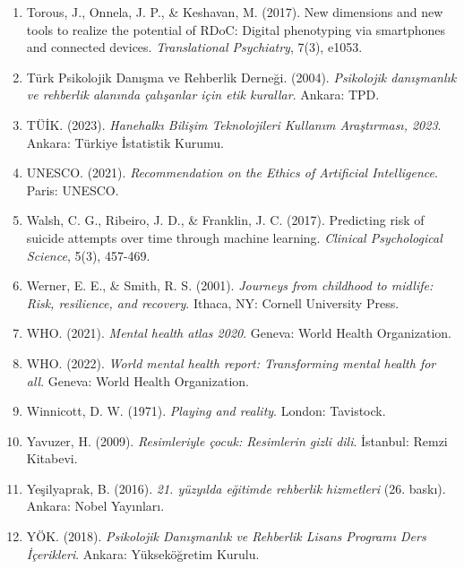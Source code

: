 \begin{enumerate}
\item Torous, J., Onnela, J. P., \& Keshavan, M. (2017). New dimensions and new tools to realize the potential of RDoC: Digital phenotyping via smartphones and connected devices. \textit{Translational Psychiatry}, 7(3), e1053.

\item Türk Psikolojik Danışma ve Rehberlik Derneği. (2004). \textit{Psikolojik danışmanlık ve rehberlik alanında çalışanlar için etik kurallar}. Ankara: TPD.

\item TÜİK. (2023). \textit{Hanehalkı Bilişim Teknolojileri Kullanım Araştırması, 2023}. Ankara: Türkiye İstatistik Kurumu.

\item UNESCO. (2021). \textit{Recommendation on the Ethics of Artificial Intelligence}. Paris: UNESCO.

\item Walsh, C. G., Ribeiro, J. D., \& Franklin, J. C. (2017). Predicting risk of suicide attempts over time through machine learning. \textit{Clinical Psychological Science}, 5(3), 457-469.

\item Werner, E. E., \& Smith, R. S. (2001). \textit{Journeys from childhood to midlife: Risk, resilience, and recovery}. Ithaca, NY: Cornell University Press.

\item WHO. (2021). \textit{Mental health atlas 2020}. Geneva: World Health Organization.

\item WHO. (2022). \textit{World mental health report: Transforming mental health for all}. Geneva: World Health Organization.

\item Winnicott, D. W. (1971). \textit{Playing and reality}. London: Tavistock.

\item Yavuzer, H. (2009). \textit{Resimleriyle çocuk: Resimlerin gizli dili}. İstanbul: Remzi Kitabevi.

\item Yeşilyaprak, B. (2016). \textit{21. yüzyılda eğitimde rehberlik hizmetleri} (26. baskı). Ankara: Nobel Yayınları.

\item YÖK. (2018). \textit{Psikolojik Danışmanlık ve Rehberlik Lisans Programı Ders İçerikleri}. Ankara: Yükseköğretim Kurulu.

\end{enumerate}

\newpage
